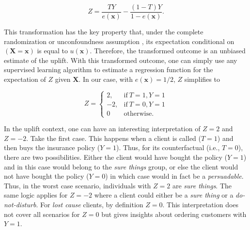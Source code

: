 \documentclass{article}
\def\X{\mathbf X}
\def\x{\mathbf x}
\begin{document}
\begin{equation}
    Z =  \frac{T Y}{e(\x)} - \frac{(1 - T) Y}{1 - e(\x)}.
    \label{eq:transformed_outcome}
\end{equation}

This transformation has the key property that, under the complete randomization or unconfoundness assumption \citep{rosenbaum1983central}, its expectation conditional on $(\X=\x)$ is equal to $u(\x)$. Therefore, the transformed outcome is an unbiased estimate of the uplift. With this transformed outcome, one can simply use any supervised learning algorithm to estimate a regression function for the expectation of $Z$ given $\X$. In our case, with $e(\x) = 1/2$, $Z$ simplifies to

\[ Z = \begin{cases} 
      2, & \mathrm{if}~T=1, Y=1 \\
      -2, & \mathrm{if}~T=0, Y=1 \\
      0 & \mathrm{otherwise.} 
   \end{cases}
\]

In the uplift context, one can have an interesting interpretation of $Z=2$ and $Z=-2$. Take the first case. This happens when a client is called ($T = 1$) and then buys the insurance policy ($Y = 1$). Thus, for its counterfactual (i.e., $T = 0$), there are two possibilities. Either the client would have bought the policy ($Y = 1$) and in this case would belong to the \textit{sure things} group, or else the client would not have bought the policy ($Y = 0$) in which case would in fact be a \textit{persuadable}. Thus, in the worst case scenario, individuals with $Z = 2$ are \textit{sure things}. The same logic applies for $Z = -2$ where a client could either be a \textit{sure thing} or a \textit{do-not-disturb}. For \textit{lost cause} clients, by definition $Z = 0$. This interpretation does not cover all scenarios for $Z=0$ but gives insights about ordering customers with $Y=1$. 
\end{document}
